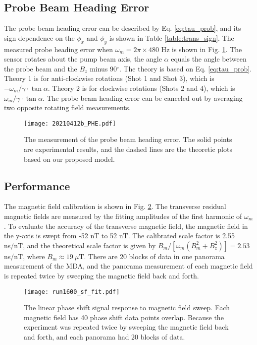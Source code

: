 \documentclass[prx,twocolumn,10pt,nofootinbib]{revtex4-1}
\begin{document}
\subsection{Probe Beam Heading Error}

The probe beam heading error can be described by Eq. \ref{eq:tau_prob}, and its sign dependence on the $\phi_x$ and $\phi_y$ is shown in Table \ref{table:trans_sign}.  The measured probe heading error when  $\omega_m =2 \pi \times480$ Hz is shown in Fig. \ref{fig:Probe_HE}.  The sensor rotates about the pump beam axis, the angle $\alpha$ equals the angle between the probe beam and the $B_z$ minus 90$^{\circ}$. The theory is based on Eq. \ref{eq:tau_prob}.  Theory 1 is for anti-clockwise rotations (Shot 1 and Shot 3), which is $-\omega_m /\gamma \cdot \tan \alpha$. Theory 2 is for clockwise rotations (Shots 2 and 4), which is $\omega_m /\gamma \cdot \tan \alpha$. The probe beam heading error can be canceled out by averaging two opposite rotating field measurements.
\begin{figure}
\centering
\texttt{[image: 20210412b\_PHE.pdf]}
\caption{The measurement of the probe beam heading error. The solid points are experimental results, and the dashed lines are the theoretic plots based on our proposed model.}
\label{fig:Probe_HE}
\end{figure}

\subsection{Performance}
The magnetic field calibration is shown in Fig. \ref{fig:sweep_mag}. The transverse residual magnetic fields are measured by the fitting amplitudes of the first harmonic of $\omega_m$. To evaluate the accuracy of the transverse magnetic field, the magnetic field in the y-axis is swept from -52 nT to 52 nT. The calibrated scale factor is 2.55 ns/nT, and the theoretical scale factor is given by $B_m/[\omega_m (B_m^2+B_z^2)]=2.53$ ns/nT, where $B_m \approx 19~\mu$T. There are 20 blocks of data in one panorama measurement of the MDA, and the panorama measurement of each magnetic field is repeated twice by sweeping the magnetic field back and forth.

\begin{figure}[H]
\centering
	\texttt{[image: run1600\_sf\_fit.pdf]}
	\caption{The linear phase shift signal response to magnetic field sweep. Each magnetic field has 40 phase shift data points overlap. Because the experiment was repeated twice by sweeping the magnetic field back and forth, and each panorama had 20 blocks of data.}
	\label{fig:sweep_mag}
\end{figure}
\end{document}
